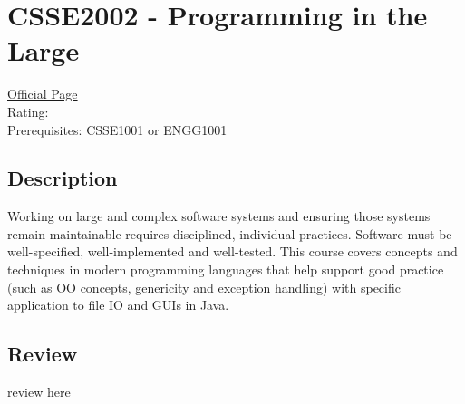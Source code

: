\hypertarget{CSSE2002}{\section{CSSE2002 - Programming in the Large}}

\large
\textcolor{turbo_purple}{\href{https://my.uq.edu.au/programs-courses/course.html?course_code=CSSE2002}{Official Page}} \\
Rating: \cstar\cstar\cstar\cstar\ostar \\
Prerequisites: CSSE1001 or ENGG1001

\normalsize
\subsection*{Description}
Working on large and complex software systems and ensuring those systems remain maintainable requires disciplined, individual practices.
Software must be well-specified, well-implemented and well-tested.
This course covers concepts and techniques in modern programming languages that help support good practice (such as OO concepts, genericity and exception handling) with specific application to file IO and GUIs in Java.

\subsection*{Review}
review here
